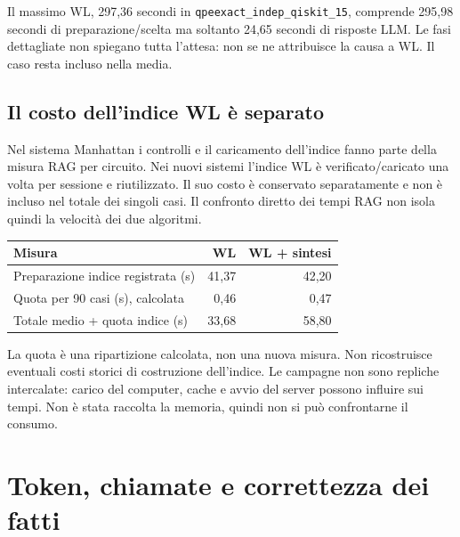 \documentclass[a4paper,10pt]{article}
\begin{document}
Il massimo WL, 297,36 secondi in \texttt{qpeexact\_indep\_qiskit\_15},
comprende 295,98 secondi di preparazione/scelta ma soltanto 24,65 secondi
di risposte LLM. Le fasi dettagliate non spiegano tutta l'attesa:
non se ne attribuisce la causa a WL. Il caso resta incluso nella media.

\subsection{Il costo dell'indice WL è separato}
Nel sistema Manhattan i controlli e il caricamento dell'indice fanno parte
della misura RAG per circuito. Nei nuovi sistemi l'indice WL è verificato/caricato
una volta per sessione e riutilizzato. Il suo costo è conservato separatamente
e non è incluso nel totale dei singoli casi. Il confronto diretto dei tempi
RAG non isola quindi la velocità dei due algoritmi.
\par\medskip\begingroup\small\renewcommand{\arraystretch}{1.18}\setlength{\tabcolsep}{5pt}
\begin{tabularx}{\linewidth}{Xrr}\toprule
Misura & WL & WL + sintesi\\\midrule
Preparazione indice registrata (s) & 41,37 & 42,20\\
Quota per 90 casi (s), calcolata & 0,46 & 0,47\\
Totale medio + quota indice (s) & 33,68 & 58,80\\
\bottomrule\end{tabularx}\endgroup\par
La quota è una ripartizione calcolata, non una nuova misura.
Non ricostruisce eventuali costi storici di costruzione dell'indice.
Le campagne non sono repliche intercalate: carico del computer, cache e avvio
del server possono influire sui tempi. Non è stata raccolta la memoria,
quindi non si può confrontarne il consumo.
\clearpage\section{Token, chiamate e correttezza dei fatti}
\par\medskip\begingroup\small\renewcommand{\arraystretch}{1.18}\setlength{\tabcolsep}{5pt}
\end{document}
